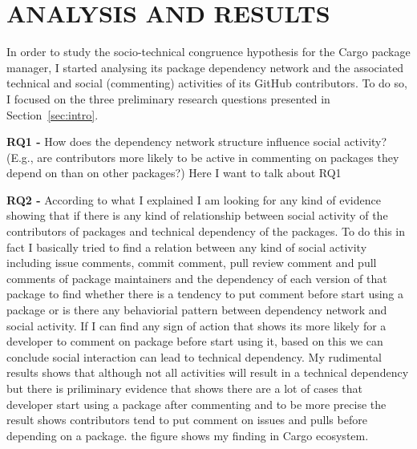 \section{ANALYSIS AND RESULTS}

In order to study the socio-technical congruence hypothesis for the Cargo package manager, I started analysing its package dependency network and the associated technical and social (commenting) activities of its GitHub contributors.
To do so, I focused on the three preliminary research questions presented in Section~\ref{sec:intro}.


\textbf{RQ1 - } How does the dependency network structure influence social activity? (E.g., are contributors more likely to be active in commenting on packages they depend on than on other packages?) Here I want to talk about RQ1 %

\textbf{RQ2 - } According to what I explained I am looking for any kind of evidence showing that if there is any kind of relationship between social activity of the contributors of packages and technical dependency of the packages. To do this in fact I basically tried to find a relation between any kind of social activity including issue comments, commit comment, pull review comment and pull comments of package maintainers and the dependency of each version of that package to find whether there is a tendency to put comment before start using a package or is there any behaviorial pattern between dependency network and social activity. If I can find any sign of action that shows its more likely for a developer to comment on package before start using it, based on this we can conclude social interaction can lead to technical dependency. My rudimental results shows that although not all activities will result in a technical dependency but there is priliminary evidence that shows there are a lot of cases that developer start using a package after commenting and to be more precise the result shows contributors tend to put comment on issues and pulls before depending on a package. the figure shows my finding in Cargo ecosystem.

